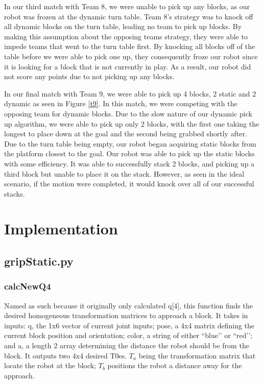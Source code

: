 \documentclass{article}
\begin{document}
In our third match with Team 8, we were unable to pick up any blocks, as our robot was frozen at the dynamic turn table.  Team 8's strategy was to knock off all dynamic blocks on the turn table, leading no team to pick up blocks.  By making this assumption about the opposing teams strategy, they were able to impede teams that went to the turn table first.  By knocking all blocks off of the table before we were able to pick one up, they consequently froze our robot since it is looking for a block that is not currently in play.  As a result, our robot did not score any points due to not picking up any blocks.

In our final match with Team 9, we were able to pick up 4 blocks, 2 static and 2 dynamic as seen in Figure \ref{t9}.  In this match, we were competing with the opposing team for dynamic blocks.  Due to the slow nature of our dynamic pick up algorithm, we were able to pick up only 2 blocks, with the first one taking the longest to place down at the goal and the second being grabbed shortly after.  Due to the turn table being empty, our robot began acquiring static blocks from the platform closest to the goal.  Our robot was able to pick up the static blocks with some efficiency.  It was able to successfully stack 2 blocks, and picking up a third block but unable to place it on the stack.  However, as seen in the ideal scenario, if the motion were completed, it would knock over all of our successful stacks.

\section{Implementation}

\subsection{gripStatic.py}
    \subsubsection{calcNewQ4}

    Named as such because it originally only calculated q[4], this function finds the desired homogeneous transformation matrices to approach a block. It takes in inputs: q, the 1x6 vector of current joint inputs; pose, a 4x4 matrix defining the current block position and orientation; color, a string of either ``blue’’ or ``red’’; and a, a length 2 array determining the distance the robot should be from the block. It outputs two 4x4 desired T0es. $T_a$ being the transformation matrix that locate the robot at the block; $T_b$ positions the robot a distance away for the approach.
    
\end{document}
